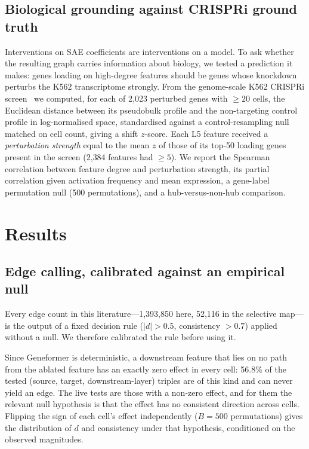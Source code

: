 \documentclass[11pt,onecolumn]{article}
\begin{document}
\subsection{Biological grounding against CRISPRi ground truth}

Interventions on SAE coefficients are interventions on a model. To ask whether the resulting graph carries information about biology, we tested a prediction it makes: genes loading on high-degree features should be genes whose knockdown perturbs the K562 transcriptome strongly. From the genome-scale K562 CRISPRi screen~\citep{replogle2022mapping} we computed, for each of 2{,}023 perturbed genes with $\geq 20$ cells, the Euclidean distance between its pseudobulk profile and the non-targeting control profile in log-normalised space, standardised against a control-resampling null matched on cell count, giving a shift $z$-score. Each L5 feature received a \emph{perturbation strength} equal to the mean $z$ of those of its top-50 loading genes present in the screen (2{,}384 features had $\geq 5$). We report the Spearman correlation between feature degree and perturbation strength, its partial correlation given activation frequency and mean expression, a gene-label permutation null (500 permutations), and a hub-versus-non-hub comparison.

\section{Results}
\label{sec:results}

\subsection{Edge calling, calibrated against an empirical null}

Every edge count in this literature---1{,}393{,}850 here, 52{,}116 in the selective map---is the output of a fixed decision rule ($|d|>0.5$, consistency $>0.7$) applied without a null. We therefore calibrated the rule before using it.

Since Geneformer is deterministic, a downstream feature that lies on no path from the ablated feature has an exactly zero effect in every cell: 56.8\% of the tested (source, target, downstream-layer) triples are of this kind and can never yield an edge. The live tests are those with a non-zero effect, and for them the relevant null hypothesis is that the effect has no consistent direction across cells. Flipping the sign of each cell's effect independently ($B=500$ permutations) gives the distribution of $d$ and consistency under that hypothesis, conditioned on the observed magnitudes.
\end{document}

